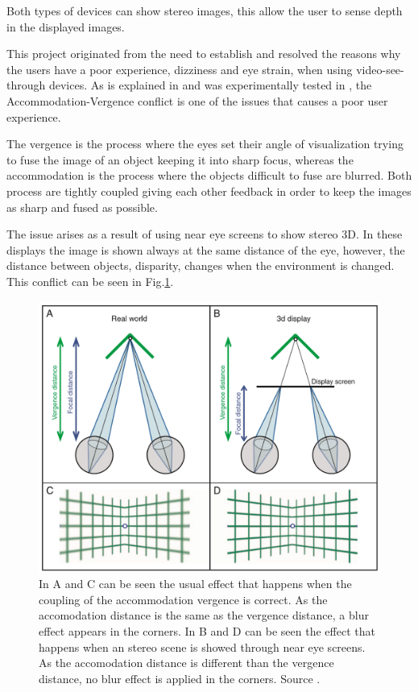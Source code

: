 \documentclass[10pt,a4paper,twocolumn,twoside]{article}
\begin{document}
	Both types of devices can show stereo images, this allow the user to sense depth in the displayed images. 
	
	This project originated from the need to establish and resolved the reasons why the users have a poor experience, dizziness and eye strain, when using video-see-through devices. As is explained in \cite{disconfortReview} and was experimentally tested in \cite{vergenceDisconfort}, the Accommodation-Vergence conflict is one of the issues that causes a poor user experience.
	
	The vergence is the process where the eyes set their angle of visualization trying to fuse the image of an object keeping it into sharp focus, whereas the accommodation is the process where the objects difficult to fuse are blurred. Both process are tightly coupled giving each other feedback in order to keep the images as sharp and fused as possible. 
	
	The issue arises as a result of using near eye screens to show stereo 3D. In these displays the image is shown always at the same distance of the eye, however, the distance between objects, disparity,  changes when the environment is changed. This conflict can be seen in Fig.\ref{fig:vergence}.
	
	\begin{figure}
		\centering
		\includegraphics[width=1\linewidth]{img/vergencia.png}
		\caption{ In A and C can be seen the usual effect that happens when the coupling of the accommodation vergence is correct. As the accomodation distance is the same as the vergence distance, a blur effect appears in the corners. In B and D can be seen the effect that happens when an stereo scene is showed through near eye screens. As the accomodation distance is different than the vergence distance, no blur effect is applied in the corners. Source \cite{vergenceDisconfort}.}
		\label{fig:vergence}
	\end{figure}
	
\end{document}
